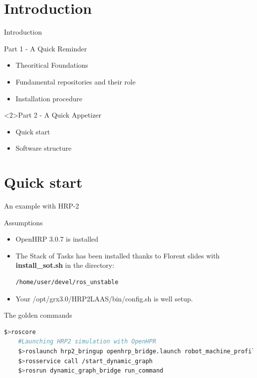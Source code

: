 \section{Introduction}
%
%


\begin{frame} {Introduction}
  \begin{block}{Part 1 - A Quick Reminder}
    \begin{itemize}
      \item Theoritical Foundations
      \item Fundamental repositories and their role
      \item Installation procedure
    \end{itemize}
  \end{block}
  \begin{block}<2>{Part 2 - A Quick Appetizer}
    \begin{itemize}
      \item Quick start
      \item Software structure
    \end{itemize}
  \end{block}
\end{frame}

\section{Quick start}

\begin{frame}[fragile]{An example with HRP-2}
  \begin{block}{Assumptions}
    \begin{itemize}
      \item OpenHRP 3.0.7 is installed
      \item The Stack of Tasks has been installed thanks to Florent slides with
        \textbf{install\_sot.sh} in the directory:
        \begin{lstlisting}[language=bash,basicstyle=\small,frame=single,showlines=false]    
          /home/user/devel/ros_unstable
        \end{lstlisting}
      \item Your /opt/grx3.0/HRP2LAAS/bin/config.sh is well setup.
    \end{itemize}
  \end{block}
  \begin{block}{The golden commands}
  \begin{lstlisting}[language=bash,basicstyle=\tiny,backgroundcolor=\color{AliceBlue}, frame=single,showlines=false]
    $>roscore
    #Launching HRP2 simulation with OpenHPR
    $>roslaunch hrp2_bringup openhrp_bridge.launch robot_machine_profile:=sim
    $>rosservice call /start_dynamic_graph 
    $>rosrun dynamic_graph_bridge run_command
  \end{lstlisting}
  \end{block}
\end{frame}

